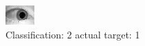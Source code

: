 \begin{figure}[h!]
\begin{center}
\includegraphics[width=0.60\columnwidth]{figures/ID1465_class_2_target_1.png}
\end{center}
\caption{ Classification: 2 actual target: 1}
\label{fig:ID1465_class_2_target_1}
\end{figure}
